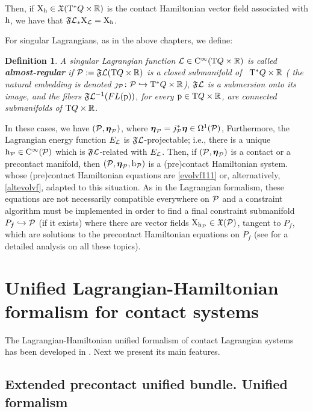 \documentclass[12pt]{report}
\newtheorem{definition}[teor]{Definition}
\def\vf{\mathfrak X}
\def\Lag{{\cal L}}
\def\Real{\mathbb{R}}
\def\bmeta{\mbox{\boldmath $\eta$}}
\def\X{{\rm X}}
\def\Tan{{\rm T}}
\def\Cinfty{{\rm C}^\infty}
\begin{document}
Then, if $\X_{\rm h}\in\vf(\Tan^*Q\times\Real)$ is the
contact Hamiltonian vector field associated with ${\rm h}$,
we have that $\mathfrak{F}\Lag_*\X_\Lag=\X_{\rm h}$.

For singular Lagrangians, as in the above chapters, we define:

\begin{definition}
A singular Lagrangian function $\Lag\in\Cinfty(\Tan Q\times\Real)$
 is called {\sl \textbf{almost-regular}} if $\mathcal{P}:=\mathfrak{F}\Lag(\Tan Q\times\Real)$ is
a closed submanifold of \ $\Tan^*Q\times\Real$ (
the natural embedding is denoted $\jmath_{\cal P}\colon\mathcal{P}\hookrightarrow\Tan^*Q\times\Real$), 
$\mathfrak{F}\Lag$ is a submersion onto its image, and
the fibers $\mathfrak{F}\Lag^{-1}(FL({\rm p}))$, for every ${\rm p}\in\Tan Q\times\Real$, are
connected submanifolds of $\Tan Q\times\Real$.
\end{definition}

In these cases, we have $({\cal P},\bmeta_{\cal P})$, where
$\bmeta_{\cal P}=j_{\cal P}^*\bmeta\in\Omega^1({\cal P})$,
Furthermore, the Lagrangian energy function $E_\Lag$ is $\mathfrak{F}\Lag$-projectable; 
i.e., there is a unique ${\rm h}_{\cal P}\in\Cinfty({\cal P})$
which is $\mathfrak{F}\Lag$-related with $E_\Lag$.
Then, if $({\cal P},\bmeta_{\cal P})$
is a contact or a precontact manifold,
then $({\cal P},\bmeta_{\cal P},{\rm h}_{\cal P})$
is a (pre)contact Hamiltonian system.
whose (pre)contact Hamiltonian equations are \eqref{evolvf111} or, alternatively, \eqref{altevolvf},
adapted to this situation.
As in the Lagrangian formalism, these equations are not necessarily compatible everywhere on ${\cal P}$ 
and a constraint algorithm must be implemented in order to find 
a final constraint submanifold $P_f\hookrightarrow{\cal P}$
(if it exists) where there are vector fields $\X_{{\rm h}_{\cal P}}\in\vf({\cal P})$,
tangent to $P_f$, which are solutions to the precontact Hamiltonian equations on $P_f$ (see \cite{DeLeon2019} for a detailed analysis on all these topics).


\section{Unified Lagrangian-Hamiltonian formalism for contact systems}
\label{ulhcs}


The Lagrangian-Hamiltonian unified formalism 
of contact Lagrangian systems has been developed in \cite{LGMMR-2020}.
Next we present its main features.


\subsection{Extended precontact unified bundle. Unified formalism}
\end{document}
